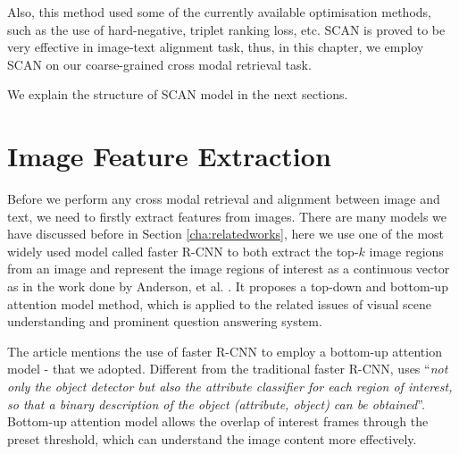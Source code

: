 Also, this method used some of the currently available optimisation methods, such as the use of hard-negative, triplet ranking loss, etc. SCAN is proved to be very effective in image-text alignment task, thus, in this chapter, we employ SCAN on our coarse-grained cross modal retrieval task.


We explain the structure of SCAN model in the next sections.

\section{Image Feature Extraction}
Before we perform any cross modal retrieval and alignment between image and text, we need to firstly extract features from images. There are many models we have discussed before in Section \ref{cha:relatedworks}, here we use one of the most widely used model called faster R-CNN to both extract the top-$k$ image regions from an image and represent the image regions of interest as a continuous vector as in the work done by Anderson, et al. \cite{bottomup}. It proposes a top-down and bottom-up attention model method, which is applied to the related issues of visual scene understanding and prominent question answering system.  

The article mentions the use of faster R-CNN to employ a bottom-up attention model - that we adopted. Different from the traditional faster R-CNN, \cite{bottomup} uses ``\textit{not only the object detector but also the attribute classifier for each region of interest, so that a binary description of the object (attribute, object) can be obtained}''. Bottom-up attention model allows the overlap of interest frames through the preset threshold, which can understand the image content more effectively.



